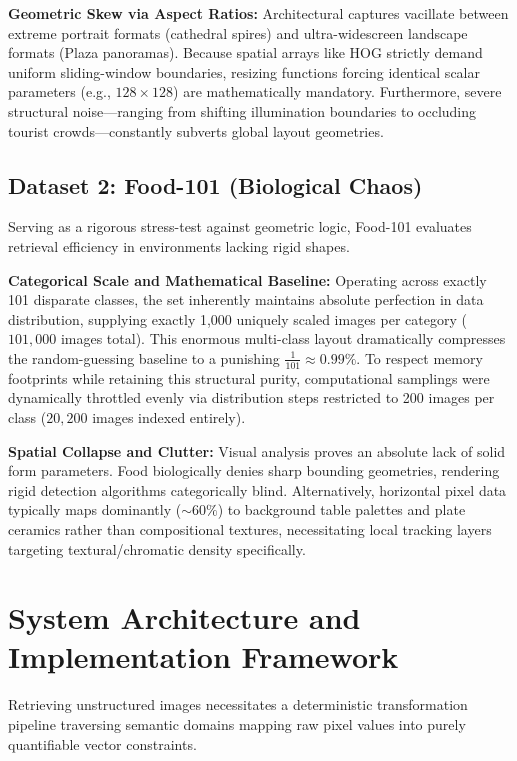 \documentclass[11pt, a4paper]{article}
\begin{document}
\textbf{Geometric Skew via Aspect Ratios:} Architectural captures vacillate between extreme portrait formats (cathedral spires) and ultra-widescreen landscape formats (Plaza panoramas). Because spatial arrays like HOG strictly demand uniform sliding-window boundaries, resizing functions forcing identical scalar parameters (e.g., $128 \times 128$) are mathematically mandatory. Furthermore, severe structural noise—ranging from shifting illumination boundaries to occluding tourist crowds—constantly subverts global layout geometries.

\subsection{Dataset 2: Food-101 (Biological Chaos)}
Serving as a rigorous stress-test against geometric logic, Food-101 evaluates retrieval efficiency in environments lacking rigid shapes.

\textbf{Categorical Scale and Mathematical Baseline:} Operating across exactly 101 disparate classes, the set inherently maintains absolute perfection in data distribution, supplying exactly 1,000 uniquely scaled images per category ($101,000$ images total). This enormous multi-class layout dramatically compresses the random-guessing baseline to a punishing $\frac{1}{101} \approx 0.99\%$. To respect memory footprints while retaining this structural purity, computational samplings were dynamically throttled evenly via distribution steps restricted to 200 images per class ($20,200$ images indexed entirely).

\textbf{Spatial Collapse and Clutter:} Visual analysis proves an absolute lack of solid form parameters. Food biologically denies sharp bounding geometries, rendering rigid detection algorithms categorically blind. Alternatively, horizontal pixel data typically maps dominantly ($\sim 60\%$) to background table palettes and plate ceramics rather than compositional textures, necessitating local tracking layers targeting textural/chromatic density specifically.

\section{System Architecture and Implementation Framework}
Retrieving unstructured images necessitates a deterministic transformation pipeline traversing semantic domains mapping raw pixel values into purely quantifiable vector constraints.
\end{document}
